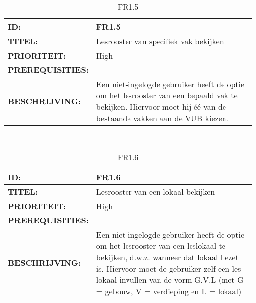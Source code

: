 \noindent\begin{table}[h]
            \begin{tabular}{l | p{10cm}}
                \textbf{ID:} & FR1.5 \\ \hline
                \textbf{TITEL:} & Lesrooster van specifiek vak bekijken \\ \hline
                \textbf{PRIORITEIT:} &  High \\ \hline
                \textbf{PREREQUISITIES:} & \\ \hline
                \textbf{BESCHRIJVING:} & Een niet-ingelogde gebruiker heeft de optie om het lesrooster van een bepaald vak te bekijken. 
                                        Hiervoor moet hij \'{e}\'{e} van de bestaande vakken aan de VUB kiezen.\\
            \end{tabular}\\
            \caption{FR1.5}
            \label{tab:FR1.5}
        \end{table}




\noindent\begin{table}[h]
            \begin{tabular}{l | p{10cm}}
                \textbf{ID:} & FR1.6 \\ \hline
                \textbf{TITEL:} & Lesrooster van een lokaal bekijken\\ \hline
                \textbf{PRIORITEIT:} &  High \\ \hline
                \textbf{PREREQUISITIES:} & \\ \hline
                \textbf{BESCHRIJVING:} & Een niet ingelogde gebruiker heeft de optie om het lesrooster van een leslokaal te bekijken, d.w.z. wanneer dat lokaal bezet is. 
                                        Hiervoor moet de gebruiker zelf een les lokaal invullen van de vorm G.V.L (met G = gebouw, V = verdieping en L = lokaal)\\
            \end{tabular}\\
            \caption{FR1.6}
            \label{tab:FR1.6}
        \end{table}
\clearpage
